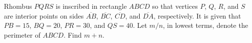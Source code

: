 Rhombus $PQRS$ is inscribed in rectangle $ABCD$ so that vertices $P$, $Q$, $R$, and $S$ are interior points on sides $\overline{AB}$, $\overline{BC}$, $\overline{CD}$, and $\overline{DA}$, respectively. It is given that $PB=15$, $BQ=20$, $PR=30$, and $QS=40$. Let $m/n$, in lowest terms, denote the perimeter of $ABCD$. Find $m+n$.